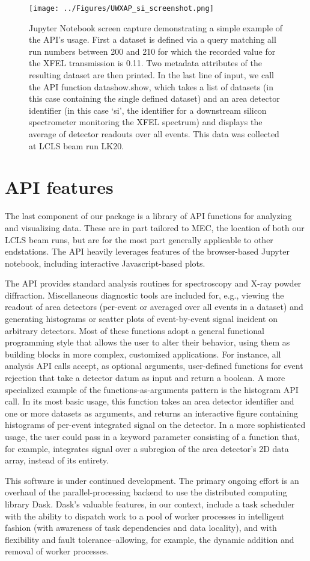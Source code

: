 \begin{figure}[h] \label{uwxap_screenshot}
\caption{Jupyter Notebook screen capture demonstrating a simple example of the API's usage. First a dataset is defined via a query matching all run numbers between 200 and 210 for which the recorded value for the XFEL transmission is 0.11. Two metadata attributes of the resulting dataset are then printed. In the last line of input, we call the API function datashow.show, which takes a list of datasets (in this case containing the single defined dataset) and an area detector identifier (in this case `si', the identifier for a downstream silicon spectrometer monitoring the XFEL spectrum) and displays the average of detector readouts over all events. This data was collected at LCLS beam run LK20. }
\centering
\texttt{[image: ../Figures/UWXAP\_si\_screenshot.png]}
\end{figure}

\section{API features}
The last component of our package is a library of API functions for analyzing and visualizing data. These are in part tailored to MEC, the location of both our LCLS beam runs, but are for the most part generally applicable to other endstations. The API heavily leverages features of the browser-based Jupyter notebook, including interactive Javascript-based plots.


The API provides standard analysis routines for spectroscopy and X-ray powder diffraction. Miscellaneous diagnostic tools are included for, e.g., viewing the readout of area detectors (per-event or averaged over all events in a dataset) and generating histograms or scatter plots of event-by-event signal incident on arbitrary detectors. Most of these functions adopt a general functional programming style that allows the user to alter their behavior, using them as building blocks in more complex, customized applications. For instance, all analysis API calls accept, as optional arguments, user-defined functions for event rejection that take a detector datum as input and return a boolean. A more specialized example of the functions-as-arguments pattern is the histogram API call. In its most basic usage, this function takes an area detector identifier and one or more datasets as arguments, and returns an interactive figure containing histograms of per-event integrated signal on the detector. In a more sophisticated usage, the user could pass in a keyword parameter consisting of a function that, for example, integrates signal over a subregion of the area detector's 2D data array, instead of its entirety. 

This software is under continued development. The primary ongoing effort is an overhaul of the parallel-processing backend to use the distributed computing library Dask. Dask's valuable features, in our context, include a task scheduler with the ability to dispatch work to a pool of worker processes in intelligent fashion (with awareness of task dependencies and data locality), and with flexibility and fault tolerance--allowing, for example, the dynamic addition and removal of worker processes. 

